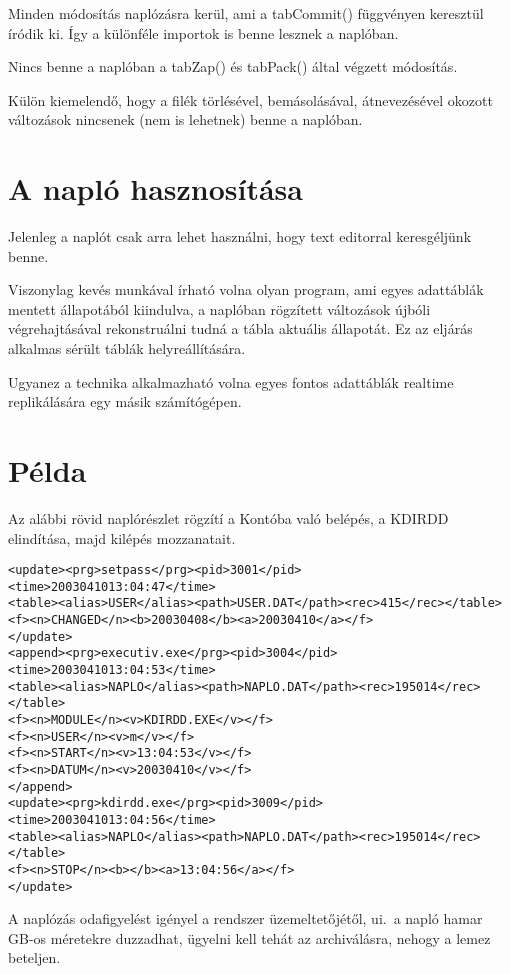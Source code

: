 Minden módosítás naplózásra kerül, ami a tabCommit() függvényen 
keresztül íródik ki. Így a különféle importok is benne lesznek 
a naplóban.

Nincs benne a naplóban a tabZap() és tabPack() által
végzett módosítás.

Külön kiemelendő, hogy a filék törlésével, bemásolásával, átnevezésével
okozott változások nincsenek (nem is lehetnek)
benne a naplóban.


\section{A napló hasznosítása}

Jelenleg a naplót csak arra lehet használni, hogy text editorral
keresgéljünk benne.

Viszonylag kevés munkával írható volna olyan program, ami egyes 
adattáblák mentett állapotából kiindulva, a naplóban rögzített változások
újbóli végrehajtásával rekonstruálni tudná a tábla aktuális állapotát.
Ez az eljárás alkalmas sérült táblák helyreállítására.

Ugyanez a technika alkalmazható volna egyes fontos adattáblák
realtime replikálására egy másik számítógépen.

\section{Példa}

Az alábbi rövid naplórészlet rögzítí a Kontóba való belépés,
a KDIRDD elindítása, majd kilépés mozzanatait.

\begin{verbatim}
<update><prg>setpass</prg><pid>3001</pid>
<time>2003041013:04:47</time>
<table><alias>USER</alias><path>USER.DAT</path><rec>415</rec></table>
<f><n>CHANGED</n><b>20030408</b><a>20030410</a></f>
</update>
<append><prg>executiv.exe</prg><pid>3004</pid>
<time>2003041013:04:53</time>
<table><alias>NAPLO</alias><path>NAPLO.DAT</path><rec>195014</rec></table>
<f><n>MODULE</n><v>KDIRDD.EXE</v></f>
<f><n>USER</n><v>m</v></f>
<f><n>START</n><v>13:04:53</v></f>
<f><n>DATUM</n><v>20030410</v></f>
</append>
<update><prg>kdirdd.exe</prg><pid>3009</pid>
<time>2003041013:04:56</time>
<table><alias>NAPLO</alias><path>NAPLO.DAT</path><rec>195014</rec></table>
<f><n>STOP</n><b></b><a>13:04:56</a></f>
</update>
\end{verbatim}

A naplózás odafigyelést igényel a rendszer üzemeltetőjétől, 
ui.\  a napló hamar GB-os méretekre duzzadhat, ügyelni kell tehát az 
archiválásra, nehogy a lemez beteljen.
 




 